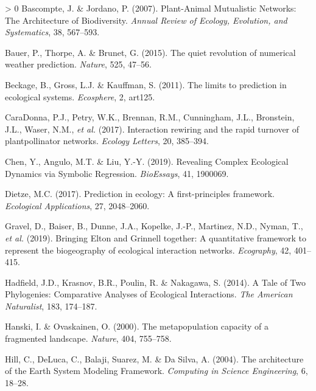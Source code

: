 \documentclass[10pt,oneside]{article}
\newlength{\cslhangindent}
\newenvironment{CSLReferences}[3] %
 {%
  \setlength{\parindent}{0pt}
  \ifodd #1 \everypar{\setlength{\hangindent}{\cslhangindent}}\ignorespaces\fi
  \ifnum #2 > 0
  \setlength{\parskip}{#2\baselineskip}
  \fi
 }%
 {}
\begin{document}
\hypertarget{refs}{}
\begin{CSLReferences}{1}{0}
\leavevmode\hypertarget{ref-Bascompte2007PlaMut}{}%
Bascompte, J. \& Jordano, P. (2007). Plant-Animal Mutualistic Networks:
The Architecture of Biodiversity. \emph{Annual Review of Ecology,
Evolution, and Systematics}, 38, 567--593.

\leavevmode\hypertarget{ref-Bauer2015QuiRev}{}%
Bauer, P., Thorpe, A. \& Brunet, G. (2015). The quiet revolution of
numerical weather prediction. \emph{Nature}, 525, 47--56.

\leavevmode\hypertarget{ref-Beckage2011LimPre}{}%
Beckage, B., Gross, L.J. \& Kauffman, S. (2011). The limits to
prediction in ecological systems. \emph{Ecosphere}, 2, art125.

\leavevmode\hypertarget{ref-CaraDonna2017IntRew}{}%
CaraDonna, P.J., Petry, W.K., Brennan, R.M., Cunningham, J.L.,
Bronstein, J.L., Waser, N.M., \emph{et al.} (2017). Interaction rewiring
and the rapid turnover of plantpollinator networks. \emph{Ecology
Letters}, 20, 385--394.

\leavevmode\hypertarget{ref-Chen2019RevCom}{}%
Chen, Y., Angulo, M.T. \& Liu, Y.-Y. (2019). Revealing Complex
Ecological Dynamics via Symbolic Regression. \emph{BioEssays}, 41,
1900069.

\leavevmode\hypertarget{ref-Dietze2017PreEco}{}%
Dietze, M.C. (2017). Prediction in ecology: A first-principles
framework. \emph{Ecological Applications}, 27, 2048--2060.

\leavevmode\hypertarget{ref-Gravel2019BriElt}{}%
Gravel, D., Baiser, B., Dunne, J.A., Kopelke, J.-P., Martinez, N.D.,
Nyman, T., \emph{et al.} (2019). Bringing Elton and Grinnell together: A
quantitative framework to represent the biogeography of ecological
interaction networks. \emph{Ecography}, 42, 401--415.

\leavevmode\hypertarget{ref-Hadfield2014TalTwo}{}%
Hadfield, J.D., Krasnov, B.R., Poulin, R. \& Nakagawa, S. (2014). A Tale
of Two Phylogenies: Comparative Analyses of Ecological Interactions.
\emph{The American Naturalist}, 183, 174--187.

\leavevmode\hypertarget{ref-Hanski2000MetCap}{}%
Hanski, I. \& Ovaskainen, O. (2000). The metapopulation capacity of a
fragmented landscape. \emph{Nature}, 404, 755--758.

\leavevmode\hypertarget{ref-Hill2004ArcEar}{}%
Hill, C., DeLuca, C., Balaji, Suarez, M. \& Da Silva, A. (2004). The
architecture of the Earth System Modeling Framework. \emph{Computing in
Science Engineering}, 6, 18--28.


\end{CSLReferences}
\end{document}
